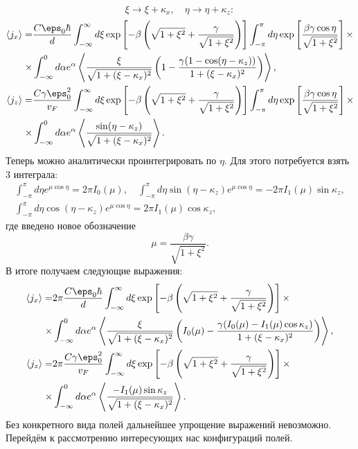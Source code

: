 \begin{equation*}
  \xi \to \xi + \kappa_x,\quad \eta \to \eta + \kappa_z:
\end{equation*}
\begin{align*}
  \langle j_x \rangle =& \frac{C\eps_0\hbar}{d} \int_{-\infty}^\infty d\xi
  \exp\left[-\beta\left(\sqrt{1+\xi^2} + \frac{\gamma}{\sqrt{1+\xi^2}}\right)\right]
  \int_{-\pi}^\pi d\eta
  \exp\left[\frac{\beta\gamma\cos\eta}{\sqrt{1+\xi^2}}\right]
    \times\\\times&
  \int_{-\infty}^{0} d \alpha e^\alpha\left\langle\frac{\xi}{\sqrt{1 + (\xi-\kappa_x)^2}}\left( 1 - \frac{\gamma(1-\cos(\eta-\kappa_z))}{1 + (\xi-\kappa_x)^2}\right)\right\rangle,\\
  \langle j_z \rangle =& \frac{C\gamma\eps_0^2}{v_F} \int_{-\infty}^\infty d\xi \exp\left[-\beta\left(\sqrt{1+\xi^2} + \frac{\gamma}{\sqrt{1+\xi^2}}\right)\right]
  \int_{-\pi}^\pi d\eta \exp\left[\frac{\beta\gamma\cos\eta}{\sqrt{1+\xi^2}}\right]
    \times\\\times&
  \int_{-\infty}^{0}d \alpha e^\alpha\left\langle\frac{\sin(\eta-\kappa_z)}{\sqrt{1+(\xi-\kappa_x)^2}}\right\rangle.
\end{align*}
Теперь можно аналитически проинтегрировать по \(\eta\). Для этого потребуется взять 3 интеграла:
\begin{gather*}
  \int_{-\pi}^\pi d\eta e^{\mu\cos\eta} = 2\pi I_0(\mu),\quad
  \int_{-\pi}^\pi d\eta \sin(\eta - \kappa_z) e^{\mu\cos\eta} =
  -2\pi I_1(\mu)\sin\kappa_z,\\
  \int_{-\pi}^\pi d\eta \cos(\eta - \kappa_z) e^{\mu\cos\eta} =
  2\pi I_1(\mu)\cos\kappa_z,
\end{gather*}
где введено новое обозначение
\begin{equation*}
  \mu = \frac{\beta \gamma}{\sqrt{1+\xi^2}}.
\end{equation*}
В итоге получаем следующие выражения:
\begin{align*}
  \langle j_x \rangle =& 2\pi \frac{C\eps_0\hbar}{d} \int_{-\infty}^\infty d\xi \exp\left[-\beta\left(\sqrt{1+\xi^2} + \frac{\gamma}{\sqrt{1+\xi^2}}\right)\right]
    \times\\\times&
    \int_{-\infty}^{0} d \alpha e^\alpha\left\langle\frac{\xi}{\sqrt{1 + (\xi-\kappa_x)^2}}\left( I_0(\mu) - \frac{\gamma(I_0(\mu)-I_1(\mu)\cos\kappa_z)}{1 + (\xi-\kappa_x)^2}\right)\right\rangle,\\
  \langle j_z \rangle =& 2\pi \frac{C\gamma\eps_0^2}{v_F} \int_{-\infty}^\infty d\xi \exp\left[-\beta\left(\sqrt{1+\xi^2} + \frac{\gamma}{\sqrt{1+\xi^2}}\right)\right]
    \times\\\times&
    \int_{-\infty}^{0}d \alpha e^\alpha\left\langle\frac{-I_1(\mu)\sin\kappa_z}{\sqrt{1+(\xi-\kappa_x)^2}}\right\rangle.
\end{align*}
Без конкретного вида полей дальнейшее упрощение выражений невозможно. Перейдём к рассмотрению интересующих нас конфигураций полей.

